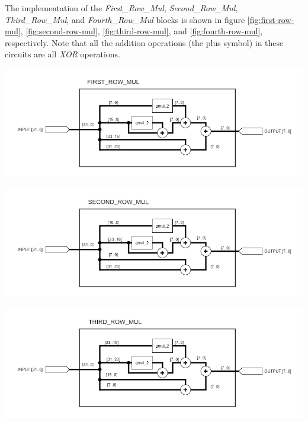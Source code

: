 \documentclass[a4paper, 10pt]{article}
\newenvironment{Figure}
    {\par\medskip\noindent\minipage{\linewidth}}
    {\endminipage\par\medskip}
\begin{document}
\begin{multicols}{2}
            The implementation of the \textit{First\_Row\_Mul}, \textit{Second\_Row\_Mul}, \textit{Third\_Row\_Mul}, and \textit{Fourth\_Row\_Mul} blocks is shown in figure \ref{fig:first-row-mul}, \ref{fig:second-row-mul}, \ref{fig:third-row-mul}, and \ref{fig:fourth-row-mul}, respectively. Note that all the addition operations (the plus symbol) in these circuits are all \textit{XOR} operations.

            \noindent
            \begin{Figure}
                \centering
                \includegraphics[width=\linewidth]{First_Row_Mul.png}
                \label{fig:first-row-mul}
            \end{Figure}

            \noindent
            \begin{Figure}
                \centering
                \includegraphics[width=\linewidth]{Second_Row_Mul.png}
                \label{fig:second-row-mul}
            \end{Figure}

            \noindent
            \begin{Figure}
                \centering
                \includegraphics[width=\linewidth]{Third_Row_Mul.png}
                \label{fig:third-row-mul}
            \end{Figure}


\end{multicols}
\end{document}
